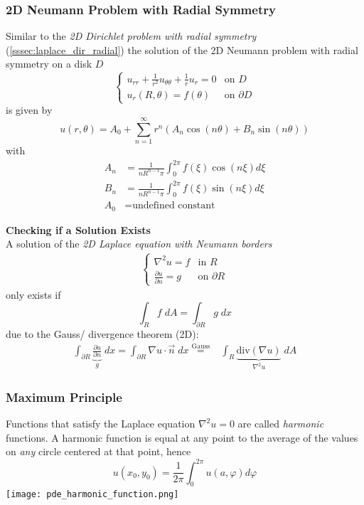 \subsubsection{2D Neumann Problem with Radial Symmetry}\label{sssec:laplace_neu_rad}
Similar to the \textit{2D Dirichlet problem with radial symmetry} (\ref{sssec:laplace_dir_radial})
the solution of the 2D Neumann problem with radial symmetry on a disk $D$
\begin{equation*}
    \begin{cases}
        u_{rr} + \frac{1}{r^2}u_{\theta\theta}+\frac{1}{r}u_r = 0 & \text{on } D          \\
        u_r(R,\theta)=f(\theta)                                   & \text{on } \partial D
    \end{cases}
\end{equation*}
is given by
\begin{equation*}
    u(r,\theta)=A_0+\sum_{n=1}^\infty r^n(A_n\cos(n\theta)+B_n\sin(n\theta))
\end{equation*}
with
\begin{align*}
    A_n & =\frac{1}{nR^{n-1}\pi}\int_{0}^{2\pi}f(\xi)\cos(n\xi)d\xi \\
    B_n & =\frac{1}{nR^{n-1}\pi}\int_{0}^{2\pi}f(\xi)\sin(n\xi)d\xi \\
    A_0 & = \text{undefined constant}
\end{align*}

\textbf{Checking if a Solution Exists}\\
A solution of the \textit{2D Laplace equation with Neumann borders} 
\begin{align*}
    \begin{cases}
        \nabla^2u=f& \text{in } R\\
        \frac{\partial u}{\partial n} = g& \text{on } \partial R
    \end{cases}
\end{align*}
only exists if 
\begin{equation*}
    \int_R f \;dA = \int_{\partial R} g \;dx
\end{equation*}
due to the Gauss/ divergence theorem (2D):
\begin{align*}
    \int_{\partial R} \underbrace{\frac{\partial u}{\partial n}}_{g}  \; dx
    =\int_{\partial R} \nabla u\cdot\vec{n}\; dx \overset{\text{Gauss}}{=}& \int_R \underbrace{\text{div}(\nabla u)}_{\nabla^2 u}\; dA
\end{align*}

\subsubsection{Maximum Principle}
Functions that satisfy the Laplace equation $\nabla^2 u=0$ are called \textit{harmonic} functions. A harmonic function is equal at any point to the average of the values on \textit{any} circle centered at that point, hence
\begin{equation*}
    u(x_0, y_0)=\frac{1}{2\pi}\int_{0}^{2\pi}u(a,\varphi)d\varphi
\end{equation*}
\texttt{[image: pde\_harmonic\_function.png]}


